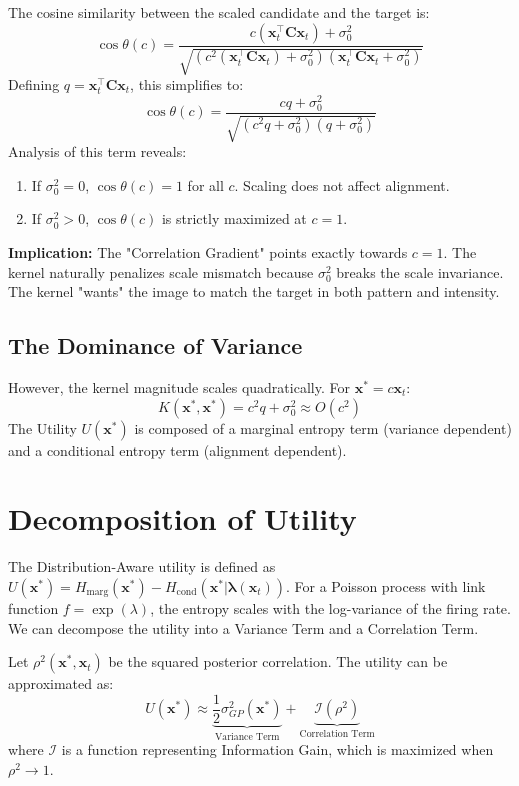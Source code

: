 \documentclass[11pt]{article}
\newcommand{\bx}{\mathbf{x}}
\newcommand{\bC}{\mathbf{C}}
\newcommand{\blambda}{\boldsymbol{\lambda}}
\begin{document}
The cosine similarity between the scaled candidate and the target is:
\begin{equation}
    \cos \theta(c) = \frac{c (\bx_t^\top \bC \bx_t) + \sigma_0^2}{\sqrt{\left(c^2 (\bx_t^\top \bC \bx_t) + \sigma_0^2\right) \left(\bx_t^\top \bC \bx_t + \sigma_0^2\right)}}
\end{equation}
Defining $q = \bx_t^\top \bC \bx_t$, this simplifies to:
\begin{equation}
    \cos \theta(c) = \frac{c q + \sigma_0^2}{\sqrt{(c^2 q + \sigma_0^2)(q + \sigma_0^2)}}
\end{equation}
Analysis of this term reveals:
\begin{enumerate}
    \item If $\sigma_0^2 = 0$, $\cos \theta(c) = 1$ for all $c$. Scaling does not affect alignment.
    \item If $\sigma_0^2 > 0$, $\cos \theta(c)$ is strictly maximized at $c=1$.
\end{enumerate}
\textbf{Implication:} The "Correlation Gradient" points exactly towards $c=1$. The kernel naturally penalizes scale mismatch because $\sigma_0^2$ breaks the scale invariance. The kernel "wants" the image to match the target in both pattern and intensity.

\subsection{The Dominance of Variance}
However, the kernel magnitude scales quadratically. For $\bx^* = c \bx_t$:
\begin{equation}
    K(\bx^*, \bx^*) = c^2 q + \sigma_0^2 \approx O(c^2)
\end{equation}
The Utility $U(\bx^*)$ is composed of a marginal entropy term (variance dependent) and a conditional entropy term (alignment dependent).

\section{Decomposition of Utility}

The Distribution-Aware utility is defined as $U(\bx^*) = H_{\text{marg}}(\bx^*) - H_{\text{cond}}(\bx^* | \blambda(\bx_t))$.
For a Poisson process with link function $f = \exp(\lambda)$, the entropy scales with the log-variance of the firing rate. We can decompose the utility into a Variance Term and a Correlation Term.

Let $\rho^2(\bx^*, \bx_t)$ be the squared posterior correlation. The utility can be approximated as:
\begin{equation}
    U(\bx^*) \approx \underbrace{\frac{1}{2} \sigma^2_{GP}(\bx^*)}_{\text{Variance Term}} + \underbrace{\mathcal{I}(\rho^2)}_{\text{Correlation Term}}
\end{equation}
where $\mathcal{I}$ is a function representing Information Gain, which is maximized when $\rho^2 \to 1$.
\end{document}
